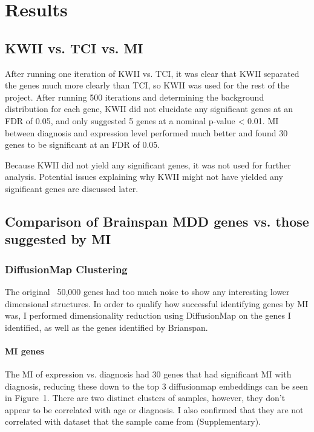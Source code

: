 \documentclass{bioinfo}
\begin{document}
\section{Results}

\subsection{KWII vs. TCI vs. MI}
After running one iteration of KWII vs. TCI, it was clear that KWII separated the genes much more clearly than TCI, so KWII was used for the rest of the project.  After running 500 iterations and determining the background distribution for each gene, KWII did not elucidate any significant genes at an FDR of 0.05, and only suggested 5 genes at a nominal p-value < 0.01.  MI between diagnosis and expression level performed much better and found 30 genes to be significant at an FDR of
0.05.

Because KWII did not yield any significant genes, it was not used for further analysis.  Potential issues explaining why KWII might not have yielded any significant genes are discussed later.

\subsection{Comparison of Brainspan MDD genes vs. those suggested by MI}

\subsubsection{DiffusionMap Clustering}
The original ~50,000 genes had too much noise to show any interesting lower dimensional structures. In order to qualify how successful identifying genes by MI was, I performed dimensionality reduction using DiffusionMap on the genes I identified, as well as the genes identified by Brianspan.

\paragraph{MI genes} The MI of expression vs. diagnosis had 30 genes that had significant MI with diagnosis, reducing these down to the top 3 diffusionmap embeddings can be seen in Figure~1\vphantom{\ref{fig:01}}.  There are two distinct clusters of samples, however, they don't appear to be correlated with age or diagnosis.  I also confirmed that they are not correlated with dataset that the sample came from (Supplementary).
\end{document}

